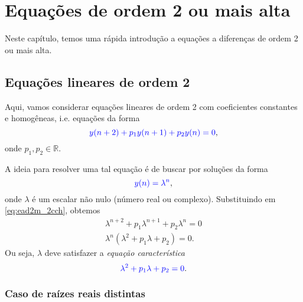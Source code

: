 

\chapter{Equações de ordem 2 ou mais alta}\label{cap_ead2m}

Neste capítulo, temos uma rápida introdução a equações a diferenças de ordem 2 ou mais alta.

\section{Equações lineares de ordem 2}\label{cap_ead2m_sec_ead2lin}

Aqui, vamos considerar equações lineares de ordem 2 com coeficientes constantes e homogêneas, i.e. equações da forma
\begin{equation}\label{eq:ead2m_2cch}
  {\color{blue}y(n+2)+p_1y(n+1)+p_2y(n)=0},
\end{equation}
onde $p_1,p_2\in\mathbb{R}$.

A ideia para resolver uma tal equação é de buscar por soluções da forma
\begin{equation}
  {\color{blue}y(n)=\lambda^n},
\end{equation}
onde $\lambda$ é um escalar não nulo (número real ou complexo). Substituindo em \eqref{eq:ead2m_2cch}, obtemos
\begin{align}
  \lambda^{n+2}+p_1\lambda^{n+1} + p_2\lambda^n = 0\\
  \lambda^n\left(\lambda^{2}+p_1\lambda + p_2\right) = 0.
\end{align}
Ou seja, $\lambda$ deve satisfazer a \emph{equação característica}
\begin{equation}\label{eq:ead2m_2ec}
  {\color{blue}\lambda^{2}+p_1\lambda + p_2 = 0}.
\end{equation}

\subsection{Caso de raízes reais distintas}

